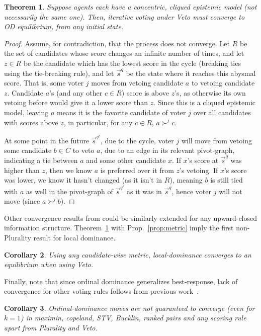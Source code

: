 \documentclass[letterpaper]{article} %
\newtheorem{theorem}{Theorem}
\newtheorem{corollary}[theorem]{Corollary}
\begin{document}
\begin{theorem}\label{itConverge}
Suppose agents each have a concentric, cliqued epistemic model (not necessarily the same one). Then, iterative voting under Veto must converge to OD equilibrium, from any initial state. 
\end{theorem}
\begin{proof}
Assume, for contradiction, that the process does not converge. Let $R$ be the set of candidates whose score changes an infinite number of times, and let $z\in R$ be the candidate which has the lowest score in the cycle (breaking ties using the tie-breaking rule), and let $\vec{s}^{q}$ be the state where it reaches this abysmal score. That is, some voter $j$ moves from vetoing candidate $a$ to vetoing candidate $z$. Candidate $a$'s (and any other $c\in R$) score is above $z$'s, as otherwise its own vetoing before would give it a lower score than $z$. Since this is a cliqued epistemic model, leaving $a$ means it is the favorite candidate of voter $j$ over all candidates with scores above $z$, in particular, for any $c\in R$, $a\succ^{j}c$.

At some point in the future $\vec{s}^{q'}$, due to the cycle, voter $j$ will move from vetoing some candidate $b\in C$ to veto $a$, due to an edge in its relevant pivot-graph, indicating a tie between $a$ and some other candidate $x$. If $x$'s score at $\vec{s}^{q}$ was higher than $z$, then we know $a$ is preferred over it from $z$'s vetoing. If $x$'s score was lower, we know it hasn't changed (as it isn't in $R$), meaning $b$ is still tied with $a$ as well in the pivot-graph of $\vec{s}^{q'}$ as it was in $\vec{s}^{q}$, hence voter $j$ will not move (since $a\succ^{j}b$).
\end{proof}

Other convergence results from \cite{MLR14} could be similarly extended for any upward-closed information structure.
Theorem~\ref{itConverge} with Prop.~\ref{prop:metric} imply the first non-Plurality result for local dominance.
\begin{corollary}
Using any candidate-wise metric, local-dominance converges to an equilibrium when using Veto.
\end{corollary}

Finally, note that since ordinal dominance generalizes best-response, lack of convergence for other voting rules follows from previous work~\cite{RW12,LR16,KSLR17}.

\begin{corollary}
Ordinal-dominance moves are not guaranteed to converge (even for $k=1$) in maximin, copeland, STV, Bucklin, ranked pairs and any scoring rule apart from Plurality and Veto.
\end{corollary}
\fi
\end{document}
